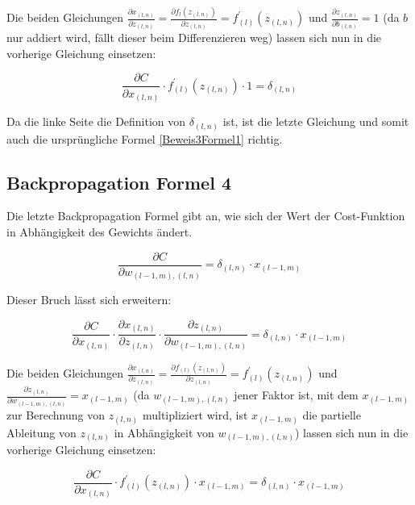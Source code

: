 \documentclass[
	a4paper,
	12pt,
	ngerman,
	oneside
]{scrreprt}											%
\begin{document}
				Die beiden Gleichungen $\frac{\partial x_{(l,n)}}{\partial z_{(l,n)}} = \frac{\partial f_{l}(z_{(l,n)})}{\partial z_{(l,n)}} = f_{(l)}^{\prime} (z_{(l,n)})$ und $\frac{\partial z_{(l,n)}}{\partial b_{(l,n)}} = 1$ (da $b$ nur addiert wird, fällt dieser beim Differenzieren weg) lassen sich nun in die vorherige Gleichung einsetzen:
				
				\begin{equation}
					\frac{\partial C}{\partial x_{(l,n)}} \cdot f_{(l)}^{\prime} (z_{(l,n)}) \cdot 1 = \delta_{(l,n)}
				\end{equation}
				
				Da die linke Seite die Definition von $\delta_{(l,n)}$ ist, ist die letzte Gleichung und somit auch die ursprüngliche Formel \ref{Beweis3Formel1} richtig. 
				
				
	
			\subsection*{Backpropagation Formel 4}
				Die letzte Backpropagation Formel gibt an, wie sich der Wert der Cost-Funktion in Abhängigkeit des Gewichts ändert. 
	
				\begin{equation}
					\frac{\partial C}{\partial w_{(l-1,m), (l,n)}} = \delta_{(l,n)} \cdot x_{(l-1,m)}
				\end{equation}
				
				Dieser Bruch lässt sich erweitern:
				
				\begin{equation}
					\frac{\partial C}{\partial x_{(l,n)}} \cdot \frac{\partial x_{(l,n)}}{\partial z_{(l,n)}} \cdot \frac{\partial z_{(l,n)}}{\partial w_{(l-1,m), (l,n)}} = \delta_{(l,n)} \cdot x_{(l-1,m)}
				\end{equation}
				
				Die beiden Gleichungen $\frac{\partial x_{(l,n)}}{\partial z_{(l,n)}} = \frac{\partial f_{(l)}(z_{(l,n)})}{\partial z_{(l,n)}} = f_{(l)}^{\prime}(z_{(l,n)})$ und $\frac{\partial z_{(l,n)}}{\partial w_{(l-1,m), (l,n)}} = x_{(l-1,m)}$ (da $w_{(l-1,m), (l,n)}$ jener Faktor ist, mit dem $x_{(l-1,m)}$ zur Berechnung von $z_{(l,n)}$ multipliziert wird, ist $x_{(l-1,m)}$ die partielle Ableitung von $z_{(l,n)}$ in Abhängigkeit von $w_{(l-1,m), (l,n)}$) lassen sich nun in die vorherige Gleichung einsetzen:
				
				\begin{equation}
					\frac{\partial C}{\partial x_{(l,n)}} \cdot f_{(l)}^{\prime}(z_{(l,n)}) \cdot x_{(l-1,m)} = \delta_{(l,n)} \cdot x_{(l-1,m)}
				\end{equation}
				
\end{document}
